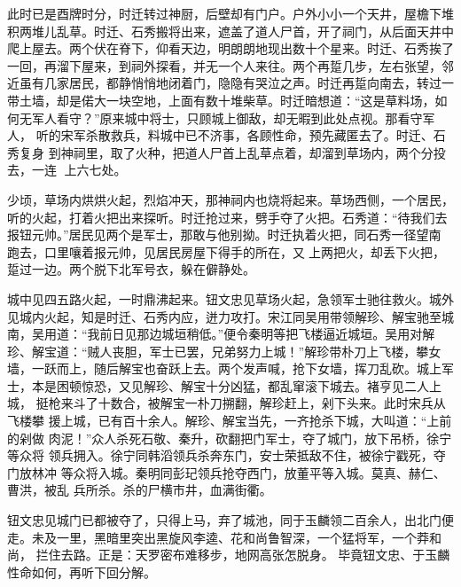 此时已是酉牌时分，时迁转过神厨，后壁却有门户。户外小小一个天井，屋檐下堆
积两堆儿乱草。时迁、石秀搬将出来，遮盖了道人尸首，开了祠门，从后面天井中
爬上屋去。两个伏在脊下，仰看天边，明朗朗地现出数十个星来。时迁、石秀挨了
一回，再溜下屋来，到祠外探看，并无一个人来往。两个再踅几步，左右张望，邻
近虽有几家居民，都静悄悄地闭着门，隐隐有哭泣之声。时迁再踅向南去，转过一
带土墙，却是偌大一块空地，上面有数十堆柴草。时迁暗想道：“这是草料场，如
何无军人看守？”原来城中将士，只顾城上御敌，却无暇到此处点视。那看守军人，
听的宋军杀散救兵，料城中已不济事，各顾性命，预先藏匿去了。时迁、石秀复身
到神祠里，取了火种，把道人尸首上乱草点着，却溜到草场内，两个分投去，一连
上六七处。

少顷，草场内烘烘火起，烈焰冲天，那神祠内也烧将起来。草场西侧，一个居民，
听的火起，打着火把出来探听。时迁抢过来，劈手夺了火把。石秀道：“待我们去
报钮元帅。”居民见两个是军士，那敢与他别拗。时迁执着火把，同石秀一径望南
跑去，口里嚷着报元帅，见居民房屋下得手的所在，又上两把火，却丢下火把，
踅过一边。两个脱下北军号衣，躲在僻静处。

城中见四五路火起，一时鼎沸起来。钮文忠见草场火起，急领军士驰往救火。城外
见城内火起，知是时迁、石秀内应，迸力攻打。宋江同吴用带领解珍、解宝驰至城
南，吴用道：“我前日见那边城垣稍低。”便令秦明等把飞楼逼近城垣。吴用对解
珍、解宝道：“贼人丧胆，军士已罢，兄弟努力上城！”解珍带朴刀上飞楼，攀女
墙，一跃而上，随后解宝也奋跃上去。两个发声喊，抢下女墙，挥刀乱砍。城上军
士，本是困顿惊恐，又见解珍、解宝十分凶猛，都乱窜滚下城去。褚亨见二人上城，
挺枪来斗了十数合，被解宝一朴刀搠翻，解珍赶上，剁下头来。此时宋兵从飞楼攀
援上城，已有百十余人。解珍、解宝当先，一齐抢杀下城，大叫道：“上前的剁做
肉泥！”众人杀死石敬、秦升，砍翻把门军士，夺了城门，放下吊桥，徐宁等众将
领兵拥入。徐宁同韩滔领兵杀奔东门，安士荣抵敌不住，被徐宁戳死，夺门放林冲
等众将入城。秦明同彭玘领兵抢夺西门，放董平等入城。莫真、赫仁、曹洪，被乱
兵所杀。杀的尸横市井，血满街衢。

钮文忠见城门已都被夺了，只得上马，弃了城池，同于玉麟领二百余人，出北门便
走。未及一里，黑暗里突出黑旋风李逵、花和尚鲁智深，一个猛将军，一个莽和尚，
拦住去路。正是：天罗密布难移步，地网高张怎脱身。
毕竟钮文忠、于玉麟性命如何，再听下回分解。